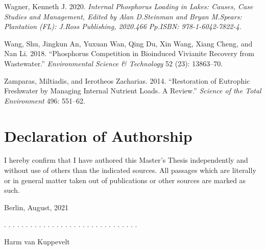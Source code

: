 \documentclass[a4paper,11pt]{article}
\newcommand{\thesistype}{Master's Thesis}
\newcommand{\thesisauthor}{Harm van Kuppevelt}
\newcommand{\thesisdate}{August, 2021}
\newenvironment{CSLReferences}%
  {}%
  {\par}
\begin{document}
\begin{CSLReferences}{1}{0}
\leavevmode\hypertarget{ref-wagner2020}{}%
Wagner, Kenneth J. 2020. \emph{Internal Phosphorus Loading in Lakes: Causes, Case Studies and Management, Edited by Alan D.Steinman and Bryan M.Spears: Plantation (FL): J.Ross Publishing, 2020.466 Pp.ISBN: 978-1-6042-7822-4}.

\leavevmode\hypertarget{ref-wangPhosphorusCompetitionBioinduced2018}{}%
Wang, Shu, Jingkun An, Yuxuan Wan, Qing Du, Xin Wang, Xiang Cheng, and Nan Li. 2018. {``Phosphorus Competition in Bioinduced Vivianite Recovery from Wastewater.''} \emph{Environmental Science \& Technology} 52 (23): 13863--70.

\leavevmode\hypertarget{ref-zamparasRestorationEutrophicFreshwater2014}{}%
Zamparas, Miltiadis, and Ierotheos Zacharias. 2014. {``Restoration of Eutrophic Freshwater by Managing Internal Nutrient Loads. {A} Review.''} \emph{Science of the Total Environment} 496: 551--62.

\end{CSLReferences}
\indent
\setlength{\parindent}{17pt}
\setlength{\leftskip}{0pt}
\setlength{\parskip}{0pt}

\newpage




\newpage
\thispagestyle{empty}
\hypertarget{declaration-of-authorship}{%
\section*{Declaration of Authorship}\label{declaration-of-authorship}}

I hereby confirm that I have authored this \thesistype{} independently and
without use of others than the indicated sources. All passages which are
literally or in general matter taken out of publications or other sources are
marked as such.
\vspace{1cm}

Berlin, \thesisdate{}
\vspace{3cm}

. . . . . . . . . . . . . . . . . . . . . . . . . . . . . . .
\vspace{0.1cm}

\thesisauthor{}
\end{document}

